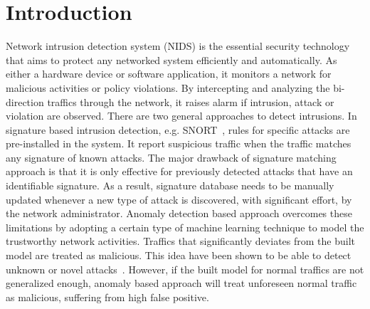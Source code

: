\section{Introduction}

Network intrusion detection system (NIDS) is the essential security technology that
aims to protect any networked system efficiently and automatically.
As either a hardware device or software application,
it monitors a network for malicious activities or policy violations.
By intercepting and analyzing the bi-direction traffics through the network,
it raises alarm if intrusion, attack or violation are observed.
There are two general approaches to detect intrusions.
In signature based intrusion detection, e.g. SNORT~\cite{Snort},
rules for specific attacks are pre-installed in the system.
It report suspicious traffic when the traffic matches any signature of known attacks.
The major drawback of signature matching approach is that
it is only effective for previously detected attacks that have an identifiable signature.
As a result, signature database needs to be manually updated whenever a new type of attack
is discovered, with significant effort, by the network administrator.
Anomaly detection based approach overcomes these limitations by adopting a certain
type of machine learning technique to model the trustworthy network activities.
Traffics that significantly deviates from the built model are treated as malicious.
This idea have been shown to be able to detect unknown or novel attacks~\cite{NSL-KDD, STL-NIDS}.
However, if the built model for normal traffics are not generalized enough,
anomaly based approach will treat unforeseen normal traffic as malicious,
suffering from high false positive.

